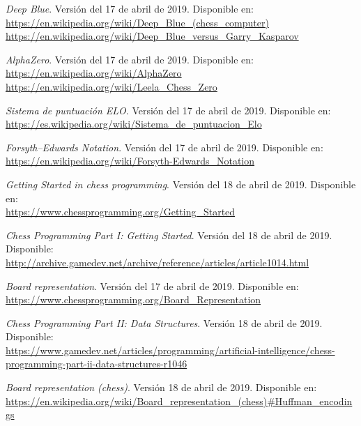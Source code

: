 \documentclass[letterpaper,12pt]{article}
\begin{document}
\begin{thebibliography}{99}
\textit{Deep Blue}. Versión del 17 de abril de 2019. Disponible en: \\
\url{https://en.wikipedia.org/wiki/Deep_Blue_(chess_computer)} \\
\url{https://en.wikipedia.org/wiki/Deep_Blue_versus_Garry_Kasparov}

\textit{AlphaZero}. Versión del 17 de abril de 2019. Disponible en: \\
\url{https://en.wikipedia.org/wiki/AlphaZero} \\
\url{https://en.wikipedia.org/wiki/Leela_Chess_Zero}

\textit{Sistema de puntuación ELO}. Versión del 17 de abril de 2019. Disponible en: \\
\url{https://es.wikipedia.org/wiki/Sistema_de_puntuacion_Elo}

\textit{Forsyth–Edwards Notation}. Versión del 17 de abril de 2019. Disponible en: \\
\url{https://en.wikipedia.org/wiki/Forsyth-Edwards_Notation}

\textit{Getting Started in chess programming}. Versión del 18 de abril de 2019. 
Disponible en: \\
\url{https://www.chessprogramming.org/Getting_Started}

\textit{Chess Programming Part I: Getting Started}. Versión del 18 de abril de 2019. 
Disponible: \\
\url{http://archive.gamedev.net/archive/reference/articles/article1014.html}

\textit{Board representation}. Versión del 17 de abril de 2019. Disponible en: \\
\url{https://www.chessprogramming.org/Board_Representation}

\textit{Chess Programming Part II: Data Structures}. Versión 18 de abril de 2019. 
Disponible: \\
\url{https://www.gamedev.net/articles/programming/artificial-intelligence/chess-programming-part-ii-data-structures-r1046}

\textit{Board representation (chess)}. Versión 18 de abril de 2019. Disponible en: \\
\url{https://en.wikipedia.org/wiki/Board_representation_(chess)#Huffman_encodings}


\end{thebibliography}
\end{document}
